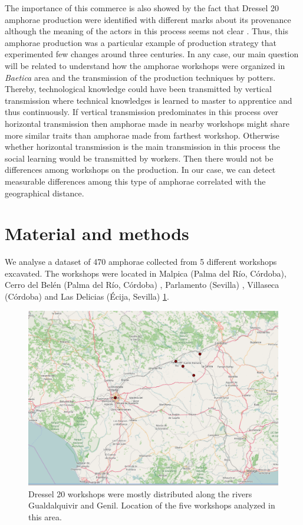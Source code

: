 \documentclass[review]{elsarticle}
\begin{document}
The importance of this commerce is also showed by the fact that Dressel 20 amphorae production were identified with different marks about its provenance although the meaning of the actors in this process seems not clear \citep{coto-sarmiento_maria_bayesian_????}. Thus, this amphorae production was a particular example of production strategy that experimented few changes around three centuries. In any case, our main question will be related to understand how the amphorae workshops were organized in \textit{Baetica} area and the transmission of the production techniques by potters. Thereby, technological knowledge could have been transmitted by vertical transmission where technical knowledges is learned to master to apprentice and thus continuously. If vertical transmission predominates in this process over horizontal transmission then amphorae made in nearby workshops might share more similar traits than amphorae made from farthest workshop. Otherwise whether horizontal transmission is the main transmission in this process the social learning would be transmitted by workers. Then there would not be differences among workshops on the production. In our case, we can detect measurable differences among this type of amphorae correlated with the geographical distance.


\section{Material and methods}

We analyse a dataset of 470 amphorae collected from 5 different workshops excavated. The workshops were located in Malpica (Palma del R\'io, C\'ordoba), Cerro del Bel\'en (Palma del R\'io, C\'ordoba) \citep{diaz_trujillo_excavacion_1992}, Parlamento (Sevilla) \citep{garcia_vargas_anforas_2000}, Villaseca (C\'ordoba)\citep{garcia_vargas_enrique_excavacion_????} and Las Delicias (\'Ecija, Sevilla) \citep{fernandez_excavacion_2001,_atelier_2014} \ref{romanworkshop}. 


\begin{figure}[htp]
	\centering
\includegraphics[scale=0.30]{romanworkshop.png}
\caption{Dressel 20 workshops were mostly distributed along the rivers Gualdalquivir and Genil. Location of the five workshops analyzed in this area.}
\label{romanworkshop}
\end{figure} 
\end{document}
